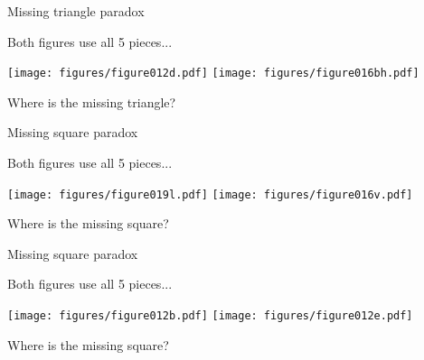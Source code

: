 \documentclass[14pt]{beamer}
\begin{document}

    \begin{frame}{Missing triangle paradox}
        \begin{center}
            Both figures use all 5 pieces...

            \vspace{36pt}

            \;\;\texttt{[image: figures/figure012d.pdf]}\qquad
            \qquad
            \texttt{[image: figures/figure016bh.pdf]}\;\;\,

            \vspace{32pt}

            Where is the missing triangle?
        \end{center}
    \end{frame}


    \begin{frame}{Missing square paradox}
        \begin{center}
            Both figures use all 5 pieces...

            \vspace{50pt}

            \texttt{[image: figures/figure019l.pdf]}\!\!\!
            \texttt{[image: figures/figure016v.pdf]}\;\;

            \vspace{32pt}

            Where is the missing square?
        \end{center}
    \end{frame}


    \begin{frame}{Missing square paradox}
        \begin{center}
            Both figures use all 5 pieces...

            \vspace{36pt}

            \;\;\texttt{[image: figures/figure012b.pdf]}\qquad
            \qquad
            \texttt{[image: figures/figure012e.pdf]}

            \vspace{32pt}

            Where is the missing square?
        \end{center}
    \end{frame}
\end{document}

